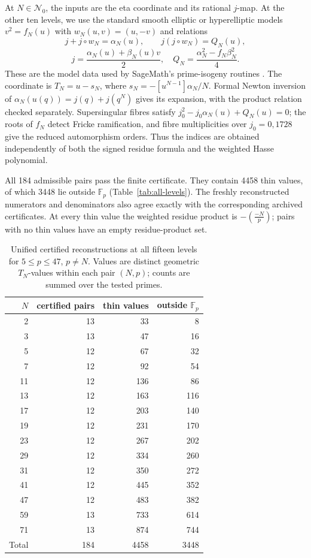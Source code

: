 \documentclass[11pt,a4paper]{article}
\numberwithin{equation}{section}
\theoremstyle{definition}
\theoremstyle{remark}
\newcommand{\Fp}{\mathbb F_p}
\begin{document}
At $N\in\mathcal N_0$, the inputs are the eta coordinate and its rational
$j$-map. At the other ten levels, we use the standard smooth elliptic or
hyperelliptic models $v^2=f_N(u)$ with $w_N(u,v)=(u,-v)$ and relations
\[
j+j\circ w_N=\alpha_N(u),\qquad
j(j\circ w_N)=Q_N(u),
\]
\[
j=\frac{\alpha_N(u)+\beta_N(u)v}{2},
\quad Q_N=\frac{\alpha_N^2-f_N\beta_N^2}{4}.
\]
These are the model data used by SageMath's prime-isogeny routines
\citep{SageModels}. The coordinate is $T_N=u-s_N$, where
$s_N=-[u^{N-1}]\alpha_N/N$. Formal Newton inversion of
$\alpha_N(u(q))=j(q)+j(q^N)$ gives its expansion, with the product relation
checked separately. Supersingular fibres satisfy
$j_0^2-j_0\alpha_N(u)+Q_N(u)=0$; the roots of $f_N$ detect Fricke
ramification, and fibre multiplicities over $j_0=0,1728$ give the reduced
automorphism orders. Thus the indices are obtained independently of both
the signed residue formula and the weighted Hasse polynomial.

All 184 admissible pairs pass the finite certificate. They contain
4458 thin values, of which 3448 lie outside $\Fp$
(Table~\ref{tab:all-levels}). The freshly reconstructed numerators and
denominators also agree exactly with the corresponding archived certificates.
At every thin value the weighted residue product is
$-\left(\frac{-N}{p}\right)$; pairs with no thin values have an empty
residue-product set.

\begin{table}[htbp]\centering\small
\begin{tabular}{rrrr}\toprule
$N$ & certified pairs & thin values & outside $\Fp$\\\midrule
2&13&33&8\\
3&13&47&16\\
5&12&67&32\\
7&12&92&54\\
11&12&136&86\\
13&12&163&116\\
17&12&203&140\\
19&12&231&170\\
23&12&267&202\\
29&12&334&260\\
31&12&350&272\\
41&12&445&352\\
47&12&483&382\\
59&13&733&614\\
71&13&874&744\\
\midrule
Total&184&4458&3448\\\bottomrule
\end{tabular}
\caption{Unified certified reconstructions at all fifteen levels for
$5\le p\le47$, $p\ne N$. Values are distinct geometric $T_N$-values
within each pair $(N,p)$; counts are summed over the tested primes.}
\label{tab:all-levels}\label{tab:n0-levels}\label{tab:new-levels}
\end{table}
\end{document}
